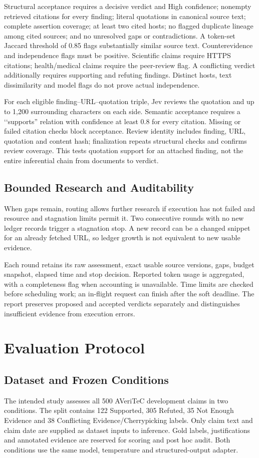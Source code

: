 \documentclass[conference]{IEEEtran}
\begin{document}
Structural acceptance requires a decisive verdict and High confidence; nonempty retrieved citations for every finding; literal quotations in canonical source text; complete assertion coverage; at least two cited hosts; no flagged duplicate lineage among cited sources; and no unresolved gaps or contradictions. A token-set Jaccard threshold of 0.85 flags substantially similar source text. Counterevidence and independence flags must be positive. Scientific claims require HTTPS citations; health/medical claims require the peer-review flag. A conflicting verdict additionally requires supporting and refuting findings. Distinct hosts, text dissimilarity and model flags do not prove actual independence.

For each eligible finding--URL--quotation triple, Jev reviews the quotation and up to 1,200 surrounding characters on each side. Semantic acceptance requires a \lq\lq supports'' relation with confidence at least 0.8 for every citation. Missing or failed citation checks block acceptance. Review identity includes finding, URL, quotation and content hash; finalization repeats structural checks and confirms review coverage. This tests quotation support for an attached finding, not the entire inferential chain from documents to verdict.

\subsection{Bounded Research and Auditability}
When gaps remain, routing allows further research if execution has not failed and resource and stagnation limits permit it. Two consecutive rounds with no new ledger records trigger a stagnation stop. A new record can be a changed snippet for an already fetched URL, so ledger growth is not equivalent to new usable evidence.

Each round retains its raw assessment, exact usable source versions, gaps, budget snapshot, elapsed time and stop decision. Reported token usage is aggregated, with a completeness flag when accounting is unavailable. Time limits are checked before scheduling work; an in-flight request can finish after the soft deadline. The report preserves proposed and accepted verdicts separately and distinguishes insufficient evidence from execution errors.

\section{Evaluation Protocol}
\subsection{Dataset and Frozen Conditions}
The intended study assesses all 500 AVeriTeC development claims in two conditions. The split contains 122 Supported, 305 Refuted, 35 Not Enough Evidence and 38 Conflicting Evidence/Cherrypicking labels. Only claim text and claim date are supplied as dataset inputs to inference. Gold labels, justifications and annotated evidence are reserved for scoring and post hoc audit. Both conditions use the same model, temperature and structured-output adapter.
\end{document}
